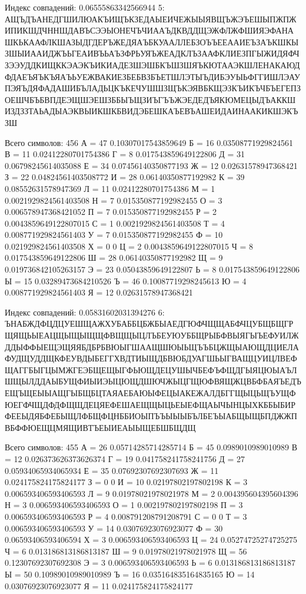 \documentclass[a4paper, 14pt]{extarticle}
\begin{document}
Индекс совпадений: 0.06555863342566944
5: АЩЪДЪАНЕДГШИЛЮАКЪИЩЪКЗЕДАЫЕИЧЕЖЫЫЯВЩЪЖЭЪЕШЫПЖПЖИПИКШДЧННШДАВЪСЭЭЫОНЕЧЪЧИААЪДКВДДЩЭЖФЛЖФШИЯЭФАНАШКЬКААФЛКШАЗЫДГДЕРЪЖЕДЯАЪБКУААЛЛЕБЗОЪЪЕЕААИЕЪЗАЪКШКЫЗШЫИААИДЖЪЬГЕАИВЪЬАЪЗФРЬУЯЪЖЕАДКЛЪЗААФКЛИЕЗПГЫЖИДЯФЧЗЭЭУДДКИЩККЭАЭКЪИКИАДЕЗШЭШБКЪШЗШЯЪКЮТААЭКШЛЕНАКАЮДФДАЕЪЯЪКЪЯАЪЬУЕЖВАКИЕЗБЕБВЗБЪЕТШЛЭТЫЪДИБЭУЫЬФГГИШЛЭАУПЭЯЪДЯФАДАШИБЪЛАДЬЦКЪКЕЧУШШЗЩЪКЭЯВБКЩЭЗКЪИКЪЧБЪЕГЕПЗОЕШЧБЪБВПДЕЭЩШЭЕШЗББЫЪЩЗИЪГЪЪЖЭЕДЕДЪЯКЮМЕЦЫДЪАККШИЗДЗЗТАЬАДЫАЭКВЫИКШКБВИДЭБЕШКАЪЕВЪАШЕИДАИНААКИКШЭКЪЗШ

Всего символов: 456
А = 47
0.10307017543859649
Б = 16
0.03508771929824561
В = 11
0.02412280701754386
Г = 8
0.017543859649122806
Д = 31
0.06798245614035088
Е = 34
0.07456140350877193
Ж = 12
0.02631578947368421
З = 22
0.04824561403508772
И = 28
0.06140350877192982
К = 39
0.08552631578947369
Л = 11
0.02412280701754386
М = 1
0.0021929824561403508
Н = 7
0.015350877192982455
О = 3
0.006578947368421052
П = 7
0.015350877192982455
Р = 2
0.0043859649122807015
С = 1
0.0021929824561403508
Т = 4
0.008771929824561403
У = 7
0.015350877192982455
Ф = 10
0.021929824561403508
Х = 0
0
Ц = 2
0.0043859649122807015
Ч = 8
0.017543859649122806
Ш = 28
0.06140350877192982
Щ = 9
0.019736842105263157
Э = 23
0.05043859649122807
Ь = 8
0.017543859649122806
Ы = 15
0.03289473684210526
Ъ = 46
0.10087719298245613
Ю = 4
0.008771929824561403
Я = 12
0.02631578947368421

Индекс совпадений: 0.05831602031394276
6: ЪНАБЖДФЦДЦУЕШЩАЖХУБАББЦБЖБЫАЕДГЮФЧЩЩАБФЧЦУБЩБЩГРЩЯЩЬЫЕАЦЩЫЩЫЩЩФВЩЩЫЦЛЪБЕУЮУББЩРЫБФВЫЯГЫЪЕФУИЛЖДДЫФФЫЕЩЭЩЯЯБДБРБВЮЫГШААЩШЮЫЬЩЪЪБЦЖЩЫАЮЩДЦИЕЛАФУДЩУДДЩКФЕУВДЫБЕГГХВДТИЫЩДБВЮБДУАГШЬЫГВАЩЦУИЦЛВЕФЩАГГБЫГЦЫМЖГЕЭБЩЕЩЫГФЬЮЩДЕЦУШЫЧБЕФЪФЩДГЫЯЦЮЫАЪЛШЩЫЛДДАЫБУЩФИЫИЭЫЦЮЩДШЮЧЖЫЦГЩЮФВЯЩЖЦВБФБАЯЪЕДЪЕЩЪЩЕЫЫАЩГЫБЩБЦТАЯАЕБАЮЫФЕЦЫАКЕЖАЛДБГГЩЫЦЬЩЪУЩФЮЕГФЧЩДФДФЩЩДЕЦЯЕФЕШАЕЩЩЫЦЬЕЫЕФЩАЫЧЫНЦЫХКББЫБИРФЕЕЫДЯБФЕБЫЩЛФБЩФЦНББИОЫПЪЪЫЫЫБЪЛБЕЪЫАБЩЫЩБПДЖЖПВБФФЮЕЩЦМЯЩИВТЪЕЫИЕАЫЫЩЕБШБЩДЩ

Всего символов: 455
А = 26
0.05714285714285714
Б = 45
0.0989010989010989
В = 12
0.026373626373626374
Г = 19
0.041758241758241756
Д = 27
0.05934065934065934
Е = 35
0.07692307692307693
Ж = 11
0.024175824175824177
З = 0
0
И = 10
0.02197802197802198
К = 3
0.006593406593406593
Л = 9
0.01978021978021978
М = 2
0.004395604395604396
Н = 3
0.006593406593406593
О = 1
0.002197802197802198
П = 3
0.006593406593406593
Р = 4
0.008791208791208791
С = 0
0
Т = 3
0.006593406593406593
У = 14
0.03076923076923077
Ф = 30
0.06593406593406594
Х = 3
0.006593406593406593
Ц = 24
0.05274725274725275
Ч = 6
0.013186813186813187
Ш = 9
0.01978021978021978
Щ = 56
0.12307692307692308
Э = 3
0.006593406593406593
Ь = 6
0.013186813186813187
Ы = 50
0.10989010989010989
Ъ = 16
0.035164835164835165
Ю = 14
0.03076923076923077
Я = 11
0.024175824175824177
\end{document}
